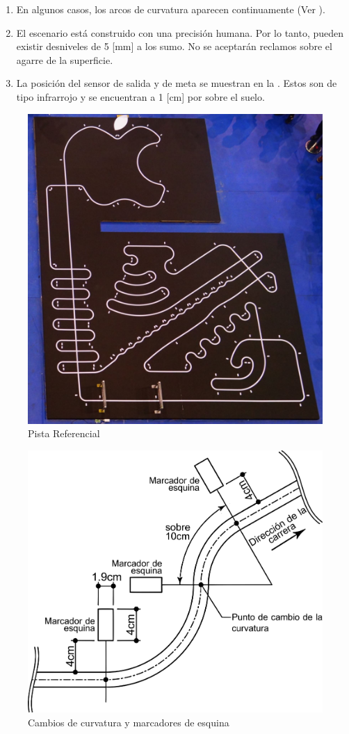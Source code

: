 \begin{enumerate}
  \item En algunos casos, los arcos de curvatura aparecen continuamente (Ver ).

  \item El escenario está construido con una precisión humana. Por lo tanto, pueden existir desniveles de 5 [mm] a los sumo. No se aceptarán reclamos sobre el agarre de la superficie.

  \item La posición del sensor de salida y de meta se muestran en la . Estos son de tipo infrarrojo y se encuentran a 1 [cm] por sobre el suelo.
\end{enumerate}

\begin{figure}[H]
  \centering
  \includegraphics[width=\linewidth]{./images/rules/figure1.png}
  \caption{Pista Referencial}
\end{figure}

\begin{figure}[H]
  \centering
  \includegraphics[width=0.6\linewidth]{./images/rules/figure2.png}
  \caption{Cambios de curvatura y marcadores de esquina}
\end{figure}

